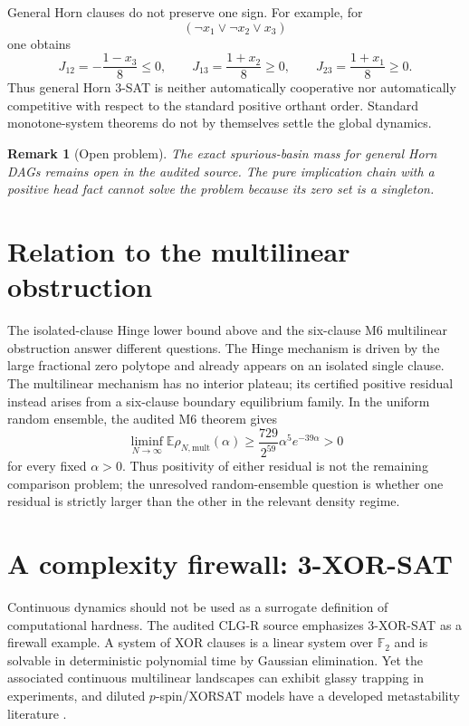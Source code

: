 \documentclass[11pt,a4paper]{article}
\newtheorem{remark}[theorem]{Remark}
\begin{document}
General Horn clauses do not preserve one sign. For example, for
\[
(\neg x_1\lor\neg x_2\lor x_3)
\]
one obtains
\[
J_{12}=-\frac{1-x_3}{8}\le0,
\qquad
J_{13}=\frac{1+x_2}{8}\ge0,
\qquad
J_{23}=\frac{1+x_1}{8}\ge0.
\]
Thus general Horn 3-SAT is neither automatically cooperative nor automatically competitive with respect to the standard positive orthant order. Standard monotone-system theorems do not by themselves settle the global dynamics.

\begin{remark}[Open problem]
The exact spurious-basin mass for general Horn DAGs remains open in the audited source. The pure implication chain with a positive head fact cannot solve the problem because its zero set is a singleton.
\end{remark}

\section{Relation to the multilinear obstruction}
The isolated-clause Hinge lower bound above and the six-clause M6 multilinear obstruction answer different questions. The Hinge mechanism is driven by the large fractional zero polytope and already appears on an isolated single clause. The multilinear mechanism has no interior plateau; its certified positive residual instead arises from a six-clause boundary equilibrium family. In the uniform random ensemble, the audited M6 theorem gives
\[
\liminf_{N\to\infty}\mathbb E\rho_{N,\mathrm{mult}}(\alpha)
\ge\frac{729}{2^{59}}\alpha^5e^{-39\alpha}>0
\]
for every fixed $\alpha>0$. Thus positivity of either residual is not the remaining comparison problem; the unresolved random-ensemble question is whether one residual is strictly larger than the other in the relevant density regime.

\section{A complexity firewall: 3-XOR-SAT}
Continuous dynamics should not be used as a surrogate definition of computational hardness. The audited CLG-R source emphasizes 3-XOR-SAT as a firewall example. A system of XOR clauses is a linear system over $\mathbb F_2$ and is solvable in deterministic polynomial time by Gaussian elimination. Yet the associated continuous multilinear landscapes can exhibit glassy trapping in experiments, and diluted $p$-spin/XORSAT models have a developed metastability literature \cite{mezard2003two,ricci2010being}.
\end{document}
